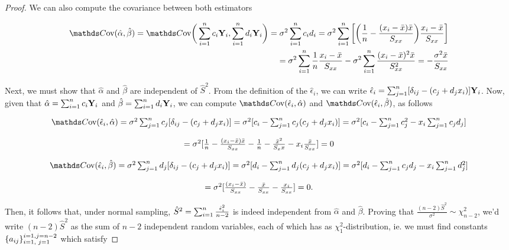 \documentclass{homework}
\begin{document}
\begin{theo}
{\begin{proof}
We can also compute the covariance between both estimators
 
\begin{align*}
    \cov(\hat{\alpha}, \hat{\beta}) = \cov \bigg(\summation c_i \Y_i, \summation d_i \Y_i \bigg) = \sigma^2 \summation c_i d_i = \sigma^2 \summation \bigg[\bigg(\frac{1}{n}-\frac{(x_i-\bar{x})\bar{x}}{S_{xx}}\bigg) \frac{x_i - \bar{x}}{S_{xx}}\bigg] \\
    = \sigma^2 \summation \frac{1}{n} \frac{x_i - \bar{x}}{S_{xx}} - \sigma^2 \summation \frac{(x_i - \bar{x})^2 \bar{x}}{S_{xx}^2} = -\frac{\sigma^2 \bar{x}}{S_{xx}}
\end{align*}

Next, we must show that $\hat{\alpha}$ and $\hat{\beta}$ are independent of $\hat{S}^2$. From the definition of the $\hat{\epsilon}_i$, we can write $
\hat{\epsilon}_i = \sum_{j=1}^{n} [\delta_{ij} - (c_j + d_j x_i)] {\bf Y}_i$. Now, given that $\hat{\alpha} = \sum_{i=1}^{n} c_i {\bf Y}_i$ and $\hat{\beta} = \sum_{i=1}^{n} d_i {\bf Y}_i$, we can compute $\cov(\hat{\epsilon}_i, \hat{\alpha})$ and $\cov(\hat{\epsilon}_i, \hat{\beta})$, as follows 

\begin{align*}
    \begin{array}{c}
        \cov(\hat{\epsilon}_i, \hat{\alpha}) = \sigma^2 \sum_{j=1}^{n} c_j [\delta_{ij} - (c_j + d_j x_i)] = \sigma^2[c_i - \sum_{j=1}^{n} c_j (c_j + d_j x_i)] = \sigma^2 [c_i - \sum_{j=1}^{n} c_j^2 - x_i \sum_{j=1}^{n} c_j d_j] \\
         \blank  \\
         = \sigma^2 [\frac{1}{n}-\frac{(x_i-\bar{x})\bar{x}}{S_{xx}} - \frac{1}{n} - \frac{\bar{x}^2}{S_xx} - x_i \frac{\bar{x}}{S_{xx}}] = 0 \\
         \blank  \\
        \cov(\hat{\epsilon}_i, \hat{\beta}) = \sigma^2 \sum_{j=1}^{n} d_j [\delta_{ij} - (c_j + d_j x_i)] = \sigma^2[d_i - \sum_{j=1}^{n} d_j (c_j + d_j x_i)]  = \sigma^2 [d_i - \sum_{j=1}^{n} c_j d_j - x_i \sum_{j=1}^{n} d_j^2]  \\
         \blank  \\
        = \sigma^2 [\frac{(x_i-\bar{x})}{S_{xx}} - \frac{\bar{x}}{S_{xx}} - \frac{x_i}{S_{xx}}] = 0.
    \end{array}
\end{align*}

Then, it follows that, under normal sampling, $\hat{S}^2 = \sum_{i=1}^{n} \frac{\hat{\epsilon}_i^2}{n-2}$ is indeed independent from $\hat{\alpha}$ and $\hat{\beta}$. Proving that $\frac{(n-2)\hat{S}^2}{\sigma^2} \sim \chi^2_{n-2}$, we'd write $(n-2)\hat{S}^2$ as the sum of $n-2$ independent random variables, each of which has as $\chi^2_1$-distribution, ie. we must find constants $\{a_{ij}\}_{i=1, \textnormal{ } j = 1}^{i = 1, j = n-2}$ which satisfy 


\end{proof}}
\end{theo}
\end{document}
